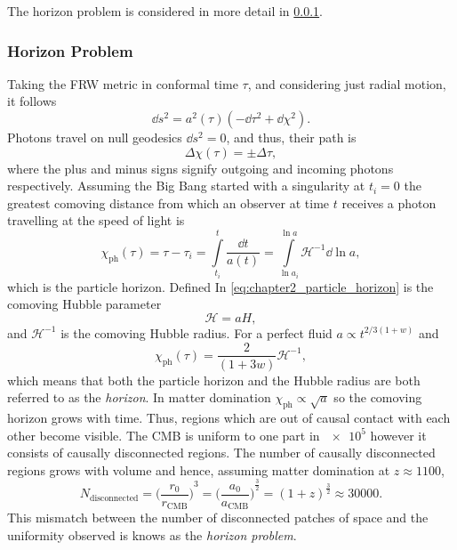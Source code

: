 \noindent
The horizon problem is considered in more detail in \cref{sec:chapter2_horizon_problem}.

\subsubsection{Horizon Problem}\label{sec:chapter2_horizon_problem}

Taking the FRW metric in conformal time \(\tau{}\), and considering just radial motion, it follows
%
\begin{equation}
	\dd{s^{2}}
	= a^{2}(\tau)(-\dd{\tau^{2}} + \dd{\chi^{2}}).
\end{equation}
%
Photons travel on null geodesics \(\dd{s^{2}}=0\), and thus, their path is
%
\begin{equation}
	\Delta\chi(\tau)
	= \pm\Delta\tau,
\end{equation}
%
where the plus and minus signs signify outgoing and incoming photons respectively.
Assuming the Big Bang started with a singularity at \(t_{i}=0\) the greatest comoving distance from which an observer at time \(t\) receives a photon travelling at the speed of light is
%
\begin{equation}\label{eq:chapter2_particle_horizon}
	\chi_{\text{ph}}(\tau)
	= \tau - \tau_{i} = \int\limits_{t_{i}}^{t} \frac{\dd{t}}{a(t)}
	= \int\limits_{\ln{a_{i}}}^{\ln{a}} \mathcal{H}^{-1} \dd{\ln{a}},
\end{equation}
%
which is the particle horizon.
Defined In \cref{eq:chapter2_particle_horizon} is the comoving Hubble parameter
%
\begin{equation}
	\mathcal{H}
	= aH,
\end{equation}
%
and \(\mathcal{H}^{-1}\) is the comoving Hubble radius.
For a perfect fluid \(a \propto t^{2/3(1+w)}\) and
%
\begin{equation}
	\chi_{\text{ph}}(\tau)
	= \frac{2}{(1+3w)} \mathcal{H}^{-1},
\end{equation}
%
which means that both the particle horizon and the Hubble radius are both referred to as the \emph{horizon}.
In matter domination \(\chi_{\text{ph}} \propto \sqrt{a}\) so the comoving horizon grows with time.
Thus, regions which are out of causal contact with each other become visible.
The CMB is uniform to one part in \(\num{e5}\) however it consists of causally disconnected regions.
The number of causally disconnected regions grows with volume and hence, assuming matter domination at \(z \approx \num{1100}\),
%
\begin{equation}
	N_{\text{disconnected}}
		= {\bigg(\frac{r_{0}}{r_{\text{CMB}}}\bigg)}^{3}
		= {\bigg(\frac{a_{0}}{a_{\text{CMB}}}\bigg)}^{\frac{3}{2}}
		= {(1+z)}^{\frac{3}{2}}
	\approx \num{30000}.
\end{equation}
%
This mismatch between the number of disconnected patches of space and the uniformity observed is knows as the \emph{horizon problem}.

